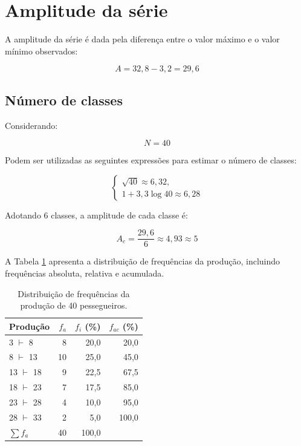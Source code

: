 \documentclass[a4paper,12pt]{article}
\begin{document}
\section{Amplitude da série}

A amplitude da série é dada pela diferença entre o valor máximo e o valor mínimo observados:

\[
A = 32,8 - 3,2 = 29,6
\]

\subsection{Número de classes}

Considerando:

\[
N = 40
\]

Podem ser utilizadas as seguintes expressões para estimar o número de classes:

\[
\begin{cases}
\sqrt{40} \approx 6,32, \\
1 + 3,3\log 40 \approx 6,28
\end{cases}
\]

Adotando 6 classes, a amplitude de cada classe é:

\[
A_c = \frac{29,6}{6} \approx 4,93 \approx 5
\]

A Tabela \ref{tab:freq_pessegueiros} apresenta a distribuição de frequências da produção, incluindo frequências absoluta, relativa e acumulada.

\begin{table}[H]
  \centering
    \begin{tabular}{lrrr}
      \toprule
      Produção & $f_a$ & $f_i$ (\%) & $f_{ac}$ (\%)\\
      \midrule
      3 $\vdash$ 8    & 8   & 20,0  & 20,0   \\
      8 $\vdash$ 13   & 10  & 25,0  & 45,0  \\
      13 $\vdash$ 18  & 9   & 22,5  & 67,5  \\
      18 $\vdash$ 23  & 7   & 17,5  & 85,0  \\
      23 $\vdash$ 28  & 4   & 10,0  & 95,0 \\
      28 $\vdash$ 33  & 2   & 5,0   & 100,0 \\
      \midrule
      $\sum f_a$ & 40 & 100,0 & \\
      \bottomrule
    \end{tabular}
\caption{Distribuição de frequências da produção de 40 pessegueiros.}
\label{tab:freq_pessegueiros}
\end{table}
\end{document}
